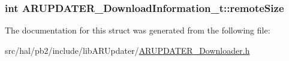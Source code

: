 \subsubsection[{\texorpdfstring{remote\+Size}{remoteSize}}]{\setlength{\rightskip}{0pt plus 5cm}int A\+R\+U\+P\+D\+A\+T\+E\+R\+\_\+\+Download\+Information\+\_\+t\+::remote\+Size}\hypertarget{struct_a_r_u_p_d_a_t_e_r___download_information__t_a549098f9598aaaa33cf020ac36d25cb7}{}\label{struct_a_r_u_p_d_a_t_e_r___download_information__t_a549098f9598aaaa33cf020ac36d25cb7}


The documentation for this struct was generated from the following file\+:\begin{DoxyCompactItemize}
\item 
src/hal/pb2/include/lib\+A\+R\+Updater/\hyperlink{_a_r_u_p_d_a_t_e_r___downloader_8h}{A\+R\+U\+P\+D\+A\+T\+E\+R\+\_\+\+Downloader.\+h}\end{DoxyCompactItemize}
